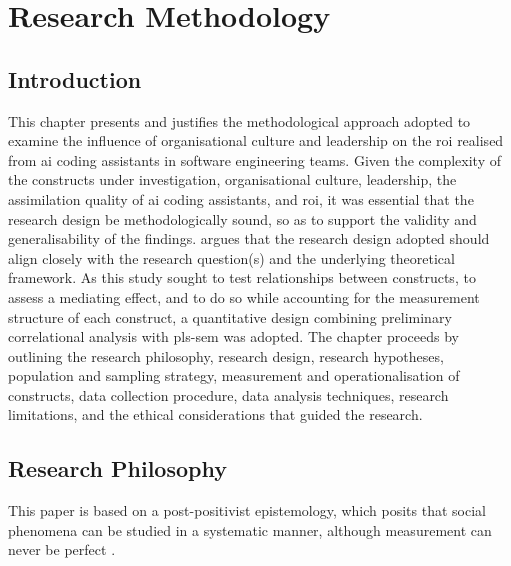\chapter{Research Methodology} %
\label{cha:ch3_methodology} %

\section{Introduction}
\label{sec:Introduction}
This chapter presents and justifies the methodological approach adopted to examine the influence of organisational culture and leadership on the \gls{roi} realised from \gls{ai} coding assistants in software engineering teams. Given the complexity of the constructs under investigation, organisational culture, leadership, the assimilation quality of \gls{ai} coding assistants, and \gls{roi}, it was essential that the research design be methodologically sound, so as to support the validity and generalisability of the findings. \textcite{Creswell2018} argues that the research design adopted should align closely with the research question(s) and the underlying theoretical framework. As this study sought to test relationships between constructs, to assess a mediating effect, and to do so while accounting for the measurement structure of each construct, a quantitative design combining preliminary correlational analysis with \gls{pls-sem} was adopted. The chapter proceeds by outlining the research philosophy, research design, research hypotheses, population and sampling strategy, measurement and operationalisation of constructs, data collection procedure, data analysis techniques, research limitations, and the ethical considerations that guided the research.

\section{Research Philosophy}
\label{sec:Research Philosophy}
This paper is based on a post-positivist epistemology, which posits that social phenomena can be studied in a systematic manner, although measurement can never be perfect \autocite{Creswell2018}.

